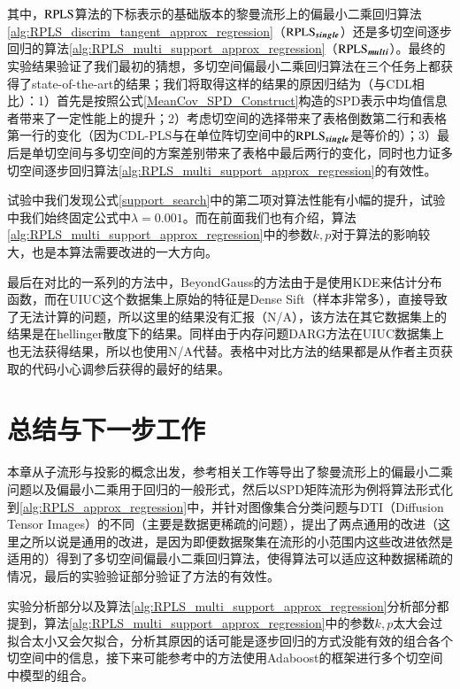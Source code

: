 其中，$\rm RPLS$算法的下标表示的基础版本的黎曼流形上的偏最小二乘回归算法\ref{alg:RPLS_discrim_tangent_approx_regression}（$\rm \bm{RPLS_{single}}$）还是多切空间逐步回归的算法\ref{alg:RPLS_multi_support_approx_regression}（$\rm \bm{RPLS_{multi}}$）。最终的实验结果验证了我们最初的猜想，多切空间偏最小二乘回归算法在三个任务上都获得了state-of-the-art的结果；我们将取得这样的结果的原因归结为（与CDL\cite{Statistics_CDL}相比）：1）首先是按照公式\ref{MeanCov_SPD_Construct}构造的SPD表示中均值信息者带来了一定性能上的提升；2）考虑切空间的选择带来了表格倒数第二行和表格第一行的变化（因为CDL-PLS与在单位阵切空间中的$\rm \bm{RPLS_{single}}$是等价的）；3）最后是单切空间与多切空间的方案差别带来了表格中最后两行的变化，同时也力证多切空间逐步回归算法\ref{alg:RPLS_multi_support_approx_regression}的有效性。

试验中我们发现公式\ref{support_search}中的第二项对算法性能有小幅的提升，试验中我们始终固定公式中$\lambda=0.001$。而在前面我们也有介绍，算法\ref{alg:RPLS_multi_support_approx_regression}中的参数$k,p$对于算法的影响较大，也是本算法需要改进的一大方向。

最后在对比的一系列的方法中，BeyondGauss\cite{Statistics_BeyondGauss}的方法由于是使用KDE来估计分布函数，而在UIUC\cite{Database_UIUC}这个数据集上原始的特征是Dense Sift（样本非常多），直接导致了无法计算的问题，所以这里的结果没有汇报（N/A），该方法在其它数据集上的结果是在hellinger散度下的结果。同样由于内存问题DARG\cite{Statistics_DARG}方法在UIUC\cite{Database_UIUC}数据集上也无法获得结果，所以也使用N/A代替。表格中对比方法的结果都是从作者主页获取的代码小心调参后获得的最好的结果。
\section{总结与下一步工作}
\label{sec:conclusion_futurework}
本章从子流形与投影的概念出发，参考相关工作\cite{PGA,RCCA,AIM_metric,Statistics_CDL}等导出了黎曼流形上的偏最小二乘问题以及偏最小二乘用于回归的一般形式，然后以SPD矩阵流形为例将算法形式化到\ref{alg:RPLS_approx_regression}中，并针对图像集合分类问题与DTI（Diffusion Tensor Images）的不同（主要是数据更稀疏的问题），提出了两点通用的改进（这里之所以说是通用的改进，是因为即便数据聚集在流形的小范围内这些改进依然是适用的）得到了多切空间偏最小二乘回归算法，使得算法可以适应这种数据稀疏的情况，最后的实验验证部分验证了方法的有效性。

实验分析部分以及算法\ref{alg:RPLS_multi_support_approx_regression}分析部分都提到，算法\ref{alg:RPLS_multi_support_approx_regression}中的参数$k,p$太大会过拟合太小又会欠拟合，分析其原因的话可能是逐步回归的方式没能有效的组合各个切空间中的信息，接下来可能参考\cite{RegionCov_pedestrain}中的方法使用Adaboost的框架进行多个切空间中模型的组合。